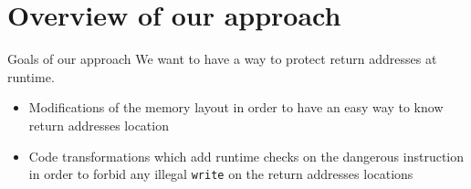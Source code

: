 \documentclass{beamer}
\begin{document}
\section{Overview of our approach}
\label{sec:Overview of our approach}

\begin{frame}[c]{Goals of our approach}
	We want to have a way to protect return addresses at runtime.
	\begin{itemize}
		\item Modifications of the memory layout in order to have an easy way to know return addresses location
		\item Code transformations which add runtime checks on the dangerous instruction in order to forbid any illegal \texttt{write} on the return addresses locations
	\end{itemize}
\end{frame}
\end{document}
